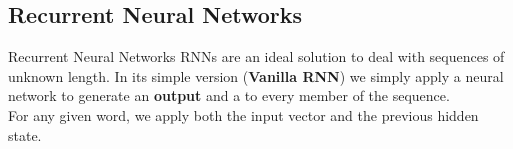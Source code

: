 \documentclass[9pt]{beamer}
\begin{document}
\subsection{Recurrent Neural Networks}


\begin{frame}{Recurrent Neural Networks}
    RNNs are an ideal solution to deal with sequences of unknown length. In its simple version (\textbf{Vanilla RNN}) we simply apply a neural network to generate an \textbf{output} and a  to every member of the sequence.
\centering
{}
    \vspace{4.3cm}\\ For any given word, we apply both the input vector and the previous hidden state.
\end{frame}
\end{document}

